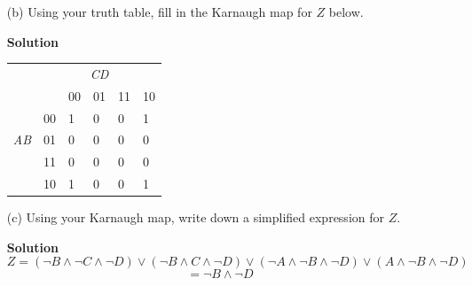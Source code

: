 \documentclass{article}\usepackage{amsmath,amssymb,amsthm,tikz,tkz-graph,color,chngpage,soul,hyperref,csquotes,graphicx,floatrow}\newcommand*{\QEDB}{\hfill\ensuremath{\square}}\newtheorem*{prop}{Proposition}\usepackage[shortlabels]{enumitem}\usepackage[nobreak=true]{mdframed}\usetikzlibrary{matrix,calc}\MakeOuterQuote{"}\usepackage[margin=1in]{geometry} \newtheorem{theorem}{Theorem} \usepackage{circuitikz}
\begin{document}
\begin{enumerate}
\begin{enumerate}
\begin{mdframed}
\begin{center}
\begin{tabular}{ c | c | c | c || c }
\end{tabular}
\end{center}
\end{mdframed}


\item[(b)] Using your truth table, fill in the Karnaugh map for $Z$ below. \\

\begin{mdframed} \textbf{Solution} \\
\begin{center}
\begin{tabular}{llllll}
                     & \multicolumn{5}{c}{\textit{CD}}                                                                                                     \\
\multicolumn{1}{c}{} & & 00 & 01 & 11 & 10\\ 
\cline{3-6} 
\multicolumn{1}{c}{} & \multicolumn{1}{l|}{00} & \multicolumn{1}{l|}{\textcircled{1}} & \multicolumn{1}{l|}{0} & \multicolumn{1}{l|}{0} & \multicolumn{1}{l|}{\textcircled{1}} \\ 
\cline{3-6} \textit{AB} & 
\multicolumn{1}{l|}{01} & \multicolumn{1}{l|}{0} & \multicolumn{1}{l|}{0} & \multicolumn{1}{l|}{0} & \multicolumn{1}{l|}{0} \\ 
\cline{3-6} & 
\multicolumn{1}{l|}{11} & \multicolumn{1}{l|}{0} & \multicolumn{1}{l|}{0} & \multicolumn{1}{l|}{0} & \multicolumn{1}{l|}{0} \\ 
\cline{3-6} & 
\multicolumn{1}{l|}{10} & \multicolumn{1}{l|}{\textcircled{1}} & \multicolumn{1}{l|}{0} & \multicolumn{1}{l|}{0} & \multicolumn{1}{l|}{\textcircled{1}} \\ \cline{3-6} 
\end{tabular}
\end{center}
\end{mdframed}

\item[(c)] Using your Karnaugh map, write down a simplified expression for $Z$. \begin{mdframed} \textbf{Solution} \\

$$Z=(\neg B \land \neg C \land \neg D) \lor (\neg B \land C \land \neg D) \lor (\neg A \land \neg B \land \neg D) \lor (A \land \neg B \land \neg D)$$
$$=\neg B \land \neg D$$
\end{mdframed}


\end{enumerate}
\end{enumerate}
\end{document}
